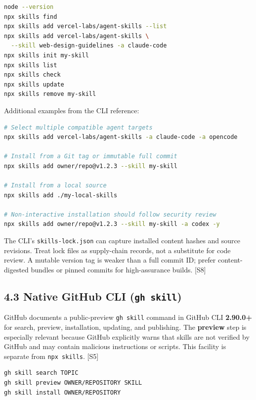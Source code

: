 \documentclass[
  10pt,
  letterpaper,
]{article}
\newcommand{\passthrough}[1]{#1}
\begin{document}
\begin{lstlisting}[language=bash]
node --version
npx skills find
npx skills add vercel-labs/agent-skills --list
npx skills add vercel-labs/agent-skills \
  --skill web-design-guidelines -a claude-code
npx skills init my-skill
npx skills list
npx skills check
npx skills update
npx skills remove my-skill
\end{lstlisting}

Additional examples from the CLI reference:

\begin{lstlisting}[language=bash]
# Select multiple compatible agent targets
npx skills add vercel-labs/agent-skills -a claude-code -a opencode

# Install from a Git tag or immutable full commit
npx skills add owner/repo@v1.2.3 --skill my-skill

# Install from a local source
npx skills add ./my-local-skills

# Non-interactive installation should follow security review
npx skills add owner/repo@v1.2.3 --skill my-skill -a codex -y
\end{lstlisting}

The CLI's \passthrough{\lstinline!skills-lock.json!} can capture
installed content hashes and source revisions. Treat lock files as
supply-chain records, not a substitute for code review. A mutable
version tag is weaker than a full commit ID; prefer content-digested
bundles or pinned commits for high-assurance builds. {[}S8{]}

\subsection{\texorpdfstring{4.3 Native GitHub CLI
(\texttt{gh\ skill})}{4.3 Native GitHub CLI (gh skill)}}\label{native-github-cli-gh-skill}

GitHub documents a public-preview \passthrough{\lstinline!gh skill!}
command in GitHub CLI \textbf{2.90.0+} for search, preview,
installation, updating, and publishing. The \textbf{preview} step is
especially relevant because GitHub explicitly warns that skills are not
verified by GitHub and may contain malicious instructions or scripts.
This facility is separate from \passthrough{\lstinline!npx skills!}.
{[}S5{]}

\begin{lstlisting}[language=bash]
gh skill search TOPIC
gh skill preview OWNER/REPOSITORY SKILL
gh skill install OWNER/REPOSITORY
\end{lstlisting}
\end{document}
